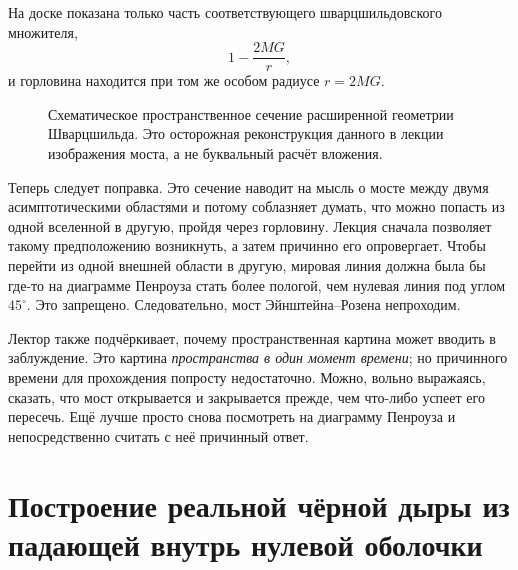 На доске показана только часть соответствующего шварцшильдовского множителя,
\begin{equation}
1-\frac{2MG}{r},
\end{equation}
и горловина находится при том же особом радиусе \(r=2MG\).

\begin{figure}[htbp]
\centering
{}
\caption{Схематическое пространственное сечение расширенной геометрии Шварцшильда. Это осторожная реконструкция данного в лекции изображения моста, а не буквальный расчёт вложения.}
\end{figure}

Теперь следует поправка. Это сечение наводит на мысль о мосте между двумя асимптотическими областями и потому соблазняет думать, что можно попасть из одной вселенной в другую, пройдя через горловину. Лекция сначала позволяет такому предположению возникнуть, а затем причинно его опровергает. Чтобы перейти из одной внешней области в другую, мировая линия должна была бы где-то на диаграмме Пенроуза стать более пологой, чем нулевая линия под углом \(45^\circ\). Это запрещено. Следовательно, мост Эйнштейна--Розена непроходим.

Лектор также подчёркивает, почему пространственная картина может вводить в заблуждение. Это картина \emph{пространства в один момент времени}; но причинного времени для прохождения попросту недостаточно. Можно, вольно выражаясь, сказать, что мост открывается и закрывается прежде, чем что-либо успеет его пересечь. Ещё лучше просто снова посмотреть на диаграмму Пенроуза и непосредственно считать с неё причинный ответ.

\section{Построение реальной чёрной дыры из падающей внутрь нулевой оболочки}


